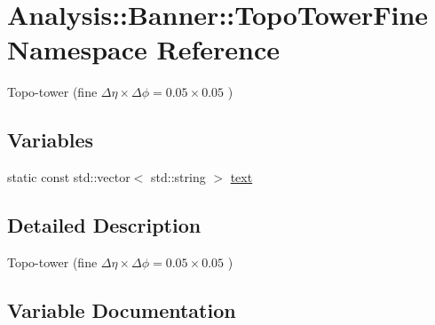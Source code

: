 \hypertarget{namespaceAnalysis_1_1Banner_1_1TopoTowerFine}{}\section{Analysis\+:\+:Banner\+:\+:Topo\+Tower\+Fine Namespace Reference}
\label{namespaceAnalysis_1_1Banner_1_1TopoTowerFine}


Topo-\/tower (fine $ \Delta\eta\times\Delta\phi = 0.05\times 0.05 $ )  


\subsection*{Variables}
\begin{DoxyCompactItemize}
\item 
static const std\+::vector$<$ std\+::string $>$ \hyperlink{namespaceAnalysis_1_1Banner_1_1TopoTowerFine_a5429950d1207be6f4f8d7d0eaa62be34}{text}
\end{DoxyCompactItemize}


\subsection{Detailed Description}
Topo-\/tower (fine $ \Delta\eta\times\Delta\phi = 0.05\times 0.05 $ ) 

\subsection{Variable Documentation}

